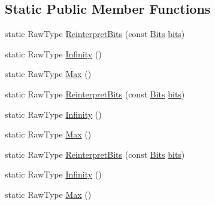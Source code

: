 \subsection*{Static Public Member Functions}
\begin{DoxyCompactItemize}
\item 
static Raw\+Type \mbox{\hyperlink{classtesting_1_1internal_1_1_floating_point_ac551f793522e54fbd8a25acb79eac5b1}{Reinterpret\+Bits}} (const \mbox{\hyperlink{classtesting_1_1internal_1_1_floating_point_abf228bf6cd48f12c8b44c85b4971a731}{Bits}} \mbox{\hyperlink{classtesting_1_1internal_1_1_floating_point_aab053be914bdc9e507c0db89740c318c}{bits}})
\item 
static Raw\+Type \mbox{\hyperlink{classtesting_1_1internal_1_1_floating_point_a460027cc19cf01ae8e09cc3796b2b575}{Infinity}} ()
\item 
static Raw\+Type \mbox{\hyperlink{classtesting_1_1internal_1_1_floating_point_aae5954d8a57d3ff0987c6930cb68e114}{Max}} ()
\item 
static Raw\+Type \mbox{\hyperlink{classtesting_1_1internal_1_1_floating_point_ac551f793522e54fbd8a25acb79eac5b1}{Reinterpret\+Bits}} (const \mbox{\hyperlink{classtesting_1_1internal_1_1_floating_point_abf228bf6cd48f12c8b44c85b4971a731}{Bits}} \mbox{\hyperlink{classtesting_1_1internal_1_1_floating_point_aab053be914bdc9e507c0db89740c318c}{bits}})
\item 
static Raw\+Type \mbox{\hyperlink{classtesting_1_1internal_1_1_floating_point_a460027cc19cf01ae8e09cc3796b2b575}{Infinity}} ()
\item 
static Raw\+Type \mbox{\hyperlink{classtesting_1_1internal_1_1_floating_point_aae5954d8a57d3ff0987c6930cb68e114}{Max}} ()
\item 
static Raw\+Type \mbox{\hyperlink{classtesting_1_1internal_1_1_floating_point_ac551f793522e54fbd8a25acb79eac5b1}{Reinterpret\+Bits}} (const \mbox{\hyperlink{classtesting_1_1internal_1_1_floating_point_abf228bf6cd48f12c8b44c85b4971a731}{Bits}} \mbox{\hyperlink{classtesting_1_1internal_1_1_floating_point_aab053be914bdc9e507c0db89740c318c}{bits}})
\item 
static Raw\+Type \mbox{\hyperlink{classtesting_1_1internal_1_1_floating_point_a460027cc19cf01ae8e09cc3796b2b575}{Infinity}} ()
\item 
static Raw\+Type \mbox{\hyperlink{classtesting_1_1internal_1_1_floating_point_aae5954d8a57d3ff0987c6930cb68e114}{Max}} ()
\end{DoxyCompactItemize}
